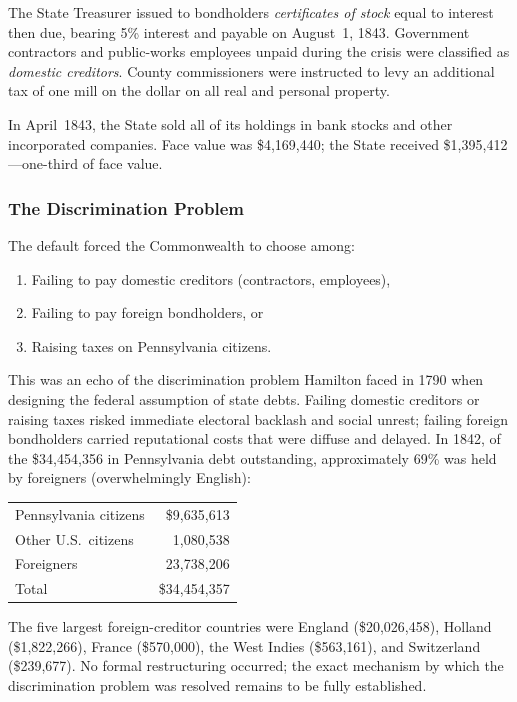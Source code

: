 \documentclass[11pt]{article}
\begin{document}
The State Treasurer issued to bondholders \emph{certificates of stock} equal to
interest then due, bearing 5\% interest and payable on August~1, 1843.
Government contractors and public-works employees unpaid during the crisis were
classified as \emph{domestic creditors}.  County commissioners were instructed
to levy an additional tax of one mill on the dollar on all real and personal
property.

In April~1843, the State sold all of its holdings in bank stocks and other
incorporated companies.  Face value was \$4,169,440; the State received
\$1,395,412---one-third of face value.

\subsubsection{The Discrimination Problem}

The default forced the Commonwealth to choose among:
\begin{enumerate}
\item Failing to pay domestic creditors (contractors, employees),
\item Failing to pay foreign bondholders, or
\item Raising taxes on Pennsylvania citizens.
\end{enumerate}

This was an echo of the discrimination problem Hamilton faced in 1790 when
designing the federal assumption of state debts.  Failing domestic creditors or
raising taxes risked immediate electoral backlash and social unrest; failing
foreign bondholders carried reputational costs that were diffuse and delayed.
In 1842, of the \$34,454,356 in Pennsylvania debt outstanding, approximately
69\% was held by foreigners (overwhelmingly English):

\begin{center}
\begin{tabular}{lr}
Pennsylvania citizens   & \$9,635,613\\
Other U.S.\ citizens   &  1,080,538\\
Foreigners             & 23,738,206\\
\hline
Total                  & \$34,454,357
\end{tabular}
\end{center}

The five largest foreign-creditor countries were England (\$20,026,458),
Holland (\$1,822,266), France (\$570,000), the West Indies (\$563,161), and
Switzerland (\$239,677).  No formal restructuring occurred; the exact mechanism
by which the discrimination problem was resolved remains to be fully
established.
\end{document}
